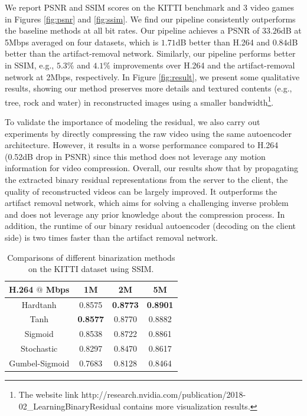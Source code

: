 \documentclass[letterpaper]{article} %
\begin{document}
We report PSNR and SSIM scores on the KITTI benchmark and 3 video games in Figures \ref{fig:psnr} and \ref{fig:ssim}. We find our pipeline consistently outperforms the baseline methods at all bit rates. Our pipeline achieves a PSNR of $33.26$dB at 5Mbps averaged on four datasets, which is $1.71$dB better than H.264 and $0.84$dB better than the artifact-removal network. Similarly, our pipeline performs better in SSIM, e.g., $5.3\%$ and $4.1\%$ improvements over H.264 and the artifact-removal network at 2Mbps, respectively. In Figure \ref{fig:result}, we present some qualitative results, showing our method preserves more details and textured contents (e.g., tree, rock and water) in reconstructed images using a smaller bandwidth\footnote{The website link http://research.nvidia.com/publication/2018-02\_Learning\-Binary\-Residual contains more visualization results.}.


To validate the importance of modeling the residual, we also carry out experiments by directly compressing the raw video using the same autoencoder architecture. However, it results in a worse performance compared to H.264 (0.52dB drop in PSNR) since this method does not leverage any motion information for video compression. 	Overall, our results show that by propagating the extracted binary residual representations from the server to the client, the quality of reconstructed videos can be largely improved. It outperforms the artifact removal network, which aims for solving a challenging inverse problem and does not leverage any prior knowledge about the compression process. In addition, the runtime of our binary residual autoencoder (decoding on the client side) is two times faster than the artifact removal network.

\begin{table}[t]
\caption{Comparisons of different binarization methods on the KITTI dataset using SSIM.
}
\centering
\begin{tabular}{cccc}
\toprule
H.264 $@$ Mbps & 1M & 2M & 5M \\
\hline

Hardtanh & 0.8575 & \textbf{0.8773} & \textbf{0.8901} \\
\hline

Tanh & \textbf{0.8577} & 0.8770 & 0.8882 \\
\hline

Sigmoid & 0.8538 & 0.8722 & 0.8861 \\
\hline

Stochastic & 0.8297 & 0.8470 & 0.8617 \\
\hline

Gumbel-Sigmoid & 0.7683 & 0.8128 & 0.8464 \\
\bottomrule
\end{tabular}
\label{tab:binary_ssim}
\end{table}
\end{document}
